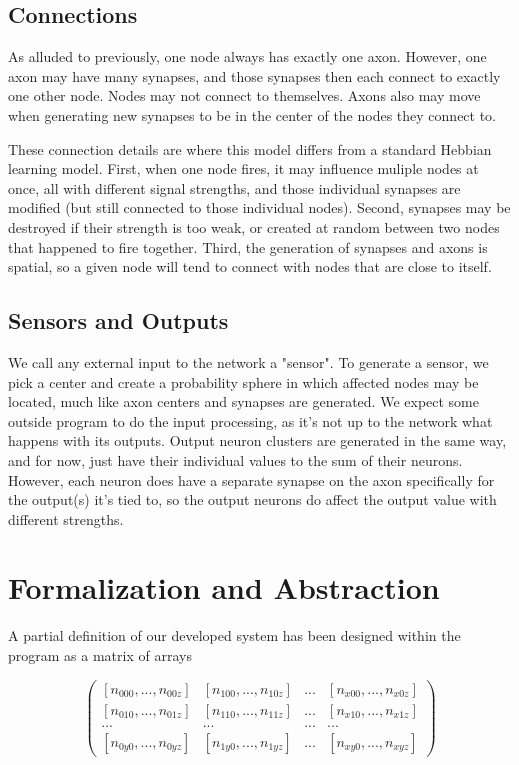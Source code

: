\documentclass[12pt]{article}
\begin{document}
\subsection{Connections} \label{simconnections}

As alluded to previously, one node always has exactly one axon.  However, one axon may have many synapses, and those synapses then each connect to exactly one other node.  Nodes may not connect to themselves.  Axons also may move when generating new synapses to be in the center of the nodes they connect to.

These connection details are where this model differs from a standard Hebbian learning model.  First, when one node fires, it may influence muliple nodes at once, all with different signal strengths, and those individual synapses are modified (but still connected to those individual nodes).  Second, synapses may be destroyed if their strength is too weak, or created at random between two nodes that happened to fire together.  Third, the generation of synapses and axons is spatial, so a given node will tend to connect with nodes that are close to itself.

\subsection{Sensors and Outputs} \label{simio}

We call any external input to the network a "sensor".  To generate a sensor, we pick a center and create a probability sphere in which affected nodes may be located, much like axon centers and synapses are generated.  We expect some outside program to do the input processing, as it's not up to the network what happens with its outputs.  Output neuron clusters are generated in the same way, and for now, just have their individual values to the sum of their neurons.  However, each neuron does have a separate synapse on the axon specifically for the output(s) it's tied to, so the output neurons do affect the output value with different strengths.

\newpage

\section{Formalization and Abstraction} \label{formal}

A partial definition of our developed system has been designed within the program as a matrix of arrays

$$
\left(\begin{array}{cccc}
{[n_{000}, ..., n_{00z}]} & {[n_{100}, ..., n_{10z}]} & ... & {[n_{x00}, ..., n_{x0z}]} \\
{[n_{010}, ..., n_{01z}]} & {[n_{110}, ..., n_{11z}]} & ... & {[n_{x10}, ..., n_{x1z}]} \\
... & ... &... & ... \\
{[n_{0y0}, ..., n_{0yz}]} & {[n_{1y0}, ..., n_{1yz}]} & ... & {[n_{xy0}, ..., n_{xyz}]}
\end{array} \right)
$$
\end{document}

